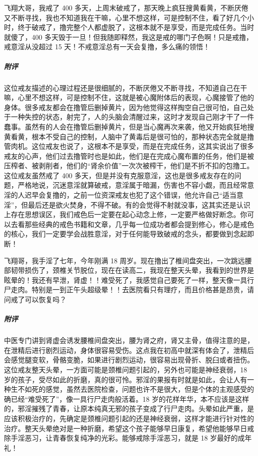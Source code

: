 \begin{case}
    飞翔大哥，我戒了 400 多天，上周末破戒了，那天晚上疯狂搜黄看黄，不断厌倦又不断寻找，我也不知道我在干嘛，心里不想这样，可是控制不住，看了好几个小时，终于破戒了，撸完整个人都虚脱了，这根本就不是享受，而是完成任务。当时就傻了，400 多天毁于一旦！但我随即释然，我这是戒的哪门子色啊！只是戒撸，戒意淫从没超过 15 天！不戒意淫总有一天会复撸，多么痛的领悟！
    \subparagraph{附评} 这位戒友描述的心理过程还是很细腻的，不断厌倦又不断寻找，不知道自己在干嘛，心里不想这样，可是控制不住，这就是被心魔附体后的表现，心魔接管了他的身体。很多戒友都会在撸管后删掉黄片，因为他觉得这样掏空自己很可怕，自己处于一种失控的状态，射完了，人的头脑会清醒过来，这时才发现自己刚才干了一件蠢事。虽然有的人会在撸管后删掉黄片，但是当心魔再次来袭，他又开始疯狂地搜黄看黄，根本不受自己的控制，人脑中了黄毒后是很可怕的，那种状态完全就是撸管肉机。这位戒友也说了，这根本不是享受，而是在完成任务，这其实说出了很多戒友的心声，他们过去撸管时也是如此，他们是在完成心魔布置的任务，他们是被压榨者、被剥削者，他们的“肾余价值”一次次被榨干，他们是不折不扣的包撸工。这位戒友虽然戒了 400 多天，但是并没有克服意淫，这也是很多戒友存在的问题，严格地说，沉迷意淫就算破戒，意淫属于暗漏，伤害也不容小觑，而且经常意淫的人迟早会复撸的，之前一位资深戒友也犯了这个错误，他允许自己“适当意淫”，但最后还是欲火焚身，不得不破。有的会觉得不射就没事，这其实还是认识上存在思想误区，我们戒色后一定要在起心动念上修，一定要严格做好断念。你可以去看那些经典的戒色书籍和文章，几乎每一位成功者都会提到修心，修心是戒色的核心，我们一定要学会战胜意淫，对于任何能导致破戒的念头，都要做到念起即断！
\end{case}

\begin{case}
    飞翔哥，我手淫了七年，今年刚满 18 周岁。现在撸出了椎间盘突出，一次跳远腰部韧带损伤了，颈椎关节脱位，现在在读高二，我现在整天头晕，我看到的世界是眩晕的！我还有早泄，肾虚！！难受死了，我感觉自己要死了一样，整天像一具行尸走肉。特别是一到正午头超级晕！！去医院看只有理疗，而且价格甚是昂贵，请问戒了可以恢复吗？
    \subparagraph{附评} 中医专门讲到肾虚会诱发腰椎间盘突出，腰为肾之府，肾又主骨，值得注意的是，在泄精后进行剧烈运动，身体很容易受伤。这点我在初高中就深有体会了，泄精后会感觉腿变软，骨骼变脆，如果进行剧烈运动，很容易出现骨折、脱臼或者扭伤。这位戒友整天头晕，一方面可能是颈椎问题引起的，另外也可能是神经衰弱，18 岁的孩子，受尽如此的折磨，真的很可怜。邪淫的果报有时就是如此，会让人有一种生不如死的感觉，虽然去医院检查，问题也许不是很大，但是个体的主观感受的确已经“难受死了”，像一具行尸走肉般活着。18 岁的花样年华，本不应该是这样的，邪淫摧残了青春，让原本纯真无邪的孩子变成了行尸走肉。头晕如此严重，是应该积极治疗的，先确定是颈椎问题引起的还是神经衰弱，这样才能进行针对性的治疗。整天头晕绝对是一种折磨，希望这个孩子能够早日康复，希望他能够早日戒除手淫恶习，让青春恢复纯净的光彩。能够戒除手淫恶习，就是 18 岁最好的成年礼！
\end{case}

